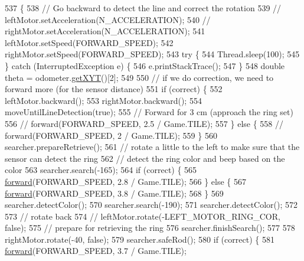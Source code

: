 \begin{DoxyCode}
537                                                                                    \{
538     \textcolor{comment}{// Go backward to detect the line and correct the rotation}
539     \textcolor{comment}{// leftMotor.setAcceleration(N\_ACCELERATION);}
540     \textcolor{comment}{// rightMotor.setAcceleration(N\_ACCELERATION);}
541     leftMotor.setSpeed(FORWARD\_SPEED);
542     rightMotor.setSpeed(FORWARD\_SPEED);
543     \textcolor{keywordflow}{try} \{
544       Thread.sleep(100);
545     \} \textcolor{keywordflow}{catch} (InterruptedException e) \{
546       e.printStackTrace();
547     \}
548     \textcolor{keywordtype}{double} theta = odometer.\hyperlink{classca_1_1mcgill_1_1ecse211_1_1odometer_1_1_odometer_data_a8f40f0264c68f0cbed4fff1723ae7863}{getXYT}()[2];
549 
550     \textcolor{comment}{// if we do correction, we need to forward more (for the sensor distance)}
551     \textcolor{keywordflow}{if} (correct) \{
552       leftMotor.backward();
553       rightMotor.backward();
554       moveUntilLineDetection(\textcolor{keyword}{true});
555       \textcolor{comment}{// Forward for 3 cm (approach the ring set)}
556       \textcolor{comment}{// forward(FORWARD\_SPEED, 2.5 / Game.TILE);}
557     \} \textcolor{keywordflow}{else} \{
558       \textcolor{comment}{// forward(FORWARD\_SPEED, 2 / Game.TILE);}
559     \}
560     searcher.prepareRetrieve();
561     \textcolor{comment}{// rotate a little to the left to make sure that the sensor can detect the ring}
562     \textcolor{comment}{// detect the ring color and beep based on the color}
563     searcher.search(-165);
564     \textcolor{keywordflow}{if} (correct) \{
565       \hyperlink{classca_1_1mcgill_1_1ecse211_1_1project_1_1_navigation_a7c66610c5b7496ddb35d342ab2cd3f08}{forward}(FORWARD\_SPEED, 2.8 / Game.TILE);
566     \} \textcolor{keywordflow}{else} \{
567       \hyperlink{classca_1_1mcgill_1_1ecse211_1_1project_1_1_navigation_a7c66610c5b7496ddb35d342ab2cd3f08}{forward}(FORWARD\_SPEED, 3.8 / Game.TILE);
568     \}
569     searcher.detectColor();
570     searcher.search(-190);
571     searcher.detectColor();
572 
573     \textcolor{comment}{// rotate back}
574     \textcolor{comment}{// leftMotor.rotate(-LEFT\_MOTOR\_RING\_COR, false);}
575     \textcolor{comment}{// prepare for retrieving the ring}
576     searcher.finishSearch();
577 
578     rightMotor.rotate(-40, \textcolor{keyword}{false});
579     searcher.safeRod();
580     \textcolor{keywordflow}{if} (correct) \{
581       \hyperlink{classca_1_1mcgill_1_1ecse211_1_1project_1_1_navigation_a7c66610c5b7496ddb35d342ab2cd3f08}{forward}(FORWARD\_SPEED, 3.7 / Game.TILE);

\end{DoxyCode}
